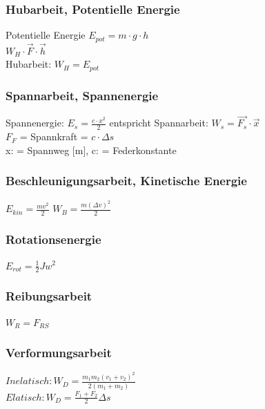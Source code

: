 \subsubsection{Hubarbeit, Potentielle Energie}

Potentielle Energie $E_{pot} = m \cdot g \cdot h$ \\
$W_{H} \cdot \overrightarrow{F} \cdot \overrightarrow{h}$ \\
Hubarbeit: $W_{H} = E_{pot}$

\subsubsection{Spannarbeit, Spannenergie}
Spannenergie: $E_{s} = \frac{c \cdot x^2}{2}$  entspricht Spannarbeit: $W_{s} = \overrightarrow{F_{s}} \cdot \overrightarrow{x}$ \\
$F_{F}$ = Spannkraft = $c \cdot \Delta s$ \\
x: = Spannweg [m], c: = Federkonstante


\subsubsection{Beschleunigungsarbeit, Kinetische Energie}
$E_{kin} = \frac{mv^2}{2}$
$W_{B} = \frac{m(\Delta v)^2}{2}$

\subsubsection{Rotationsenergie}
$E_{rot} = \frac{1}{2}Jw^2$

\subsubsection{Reibungsarbeit}
$W_{R} = F_{RS}$

\subsubsection{Verformungsarbeit}
$Inelatisch: W_{D} = \frac{m_{1}m_{2}(v_{1} + v_{2})^2}{2(m_{1} + m_{2})} $ \\
$Elatisch:  W_{D} = \frac{F_{1} + F_{2}}{2}\Delta s$
